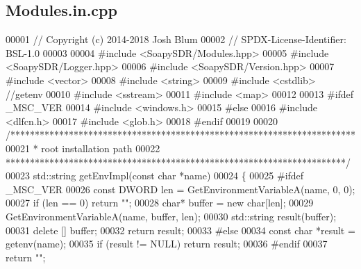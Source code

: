 \subsection{Modules.\+in.\+cpp}
\label{Modules_8in_8cpp_source}

\begin{DoxyCode}
00001 \textcolor{comment}{// Copyright (c) 2014-2018 Josh Blum}
00002 \textcolor{comment}{// SPDX-License-Identifier: BSL-1.0}
00003 
00004 \textcolor{preprocessor}{#include <SoapySDR/Modules.hpp>}
00005 \textcolor{preprocessor}{#include <SoapySDR/Logger.hpp>}
00006 \textcolor{preprocessor}{#include <SoapySDR/Version.hpp>}
00007 \textcolor{preprocessor}{#include <vector>}
00008 \textcolor{preprocessor}{#include <string>}
00009 \textcolor{preprocessor}{#include <cstdlib>} \textcolor{comment}{//getenv}
00010 \textcolor{preprocessor}{#include <sstream>}
00011 \textcolor{preprocessor}{#include <map>}
00012 
00013 \textcolor{preprocessor}{#ifdef \_MSC\_VER}
00014 \textcolor{preprocessor}{#include <windows.h>}
00015 \textcolor{preprocessor}{#else}
00016 \textcolor{preprocessor}{#include <dlfcn.h>}
00017 \textcolor{preprocessor}{#include <glob.h>}
00018 \textcolor{preprocessor}{#endif}
00019 
00020 \textcolor{comment}{/***********************************************************************}
00021 \textcolor{comment}{ * root installation path}
00022 \textcolor{comment}{ **********************************************************************/}
00023 std::string getEnvImpl(\textcolor{keyword}{const} \textcolor{keywordtype}{char} *name)
00024 \{
00025 \textcolor{preprocessor}{    #ifdef \_MSC\_VER}
00026     \textcolor{keyword}{const} DWORD len = GetEnvironmentVariableA(name, 0, 0);
00027     \textcolor{keywordflow}{if} (len == 0) \textcolor{keywordflow}{return} \textcolor{stringliteral}{""};
00028     \textcolor{keywordtype}{char}* buffer = \textcolor{keyword}{new} \textcolor{keywordtype}{char}[len];
00029     GetEnvironmentVariableA(name, buffer, len);
00030     std::string result(buffer);
00031     \textcolor{keyword}{delete} [] buffer;
00032     \textcolor{keywordflow}{return} result;
00033 \textcolor{preprocessor}{    #else}
00034     \textcolor{keyword}{const} \textcolor{keywordtype}{char} *result = getenv(name);
00035     \textcolor{keywordflow}{if} (result != NULL) \textcolor{keywordflow}{return} result;
00036 \textcolor{preprocessor}{    #endif}
00037     \textcolor{keywordflow}{return} \textcolor{stringliteral}{""};

\end{DoxyCode}
